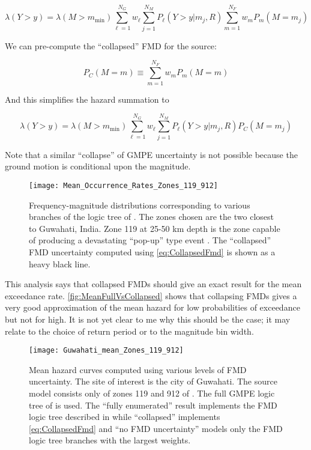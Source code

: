 \documentclass{article}
\begin{document}
$$ \lambda(Y > y) = 
\lambda(M > m_\text{min}) 
\sum_{\ell=1}^{N_G} w_\ell 
\sum_{j=1}^{N_M} 
P_\ell(Y > y|m_j,R) 
\sum_{m=1}^{N_F} w_m 
P_m(M=m_j) $$

We can pre-compute the ``collapsed'' FMD for the source:

$$ P_C(M=m) \equiv \sum_{m=1}^{N_F} w_m P_m(M=m) $$

And this simplifies the hazard summation to

$$ \lambda(Y > y) = 
\lambda(M > m_\text{min}) 
\sum_{\ell=1}^{N_G} w_\ell 
\sum_{j=1}^{N_M} 
P_\ell(Y > y|m_j,R) 
P_C(M=m_j) $$

Note that a similar ``collapse'' of GMPE uncertainty is not possible because the ground motion is conditional upon the magnitude.

\begin{figure}[!htb]
\begin{adjustbox}{center}
\texttt{[image: Mean\_Occurrence\_Rates\_Zones\_119\_912]}
\end{adjustbox}
\caption[Frequency-magnitude distributions for two zones nearest to Guwahati, India]{Frequency-magnitude distributions corresponding to various branches of the logic tree of \cite{nath2012probabilistic}. The zones chosen are the two closest to Guwahati, India. Zone 119 at 25-50 km depth is the zone capable of producing a devastating ``pop-up'' type event \citep{Bilham2001, nath2012ground}. The ``collapsed'' FMD uncertainty computed using \eqref{eq:CollapsedFmd} is shown as a heavy black line.} 
\label{fig:CollapsedFmd}
\end{figure}

This analysis says that collapsed FMDs should give an exact result for the mean exceedance rate. \autoref{fig:MeanFullVsCollapsed} shows that collapsing FMDs gives a very good approximation of the mean hazard for low probabilities of exceedance but not for high. It is not yet clear to me why this should be the case; it may relate to the choice of return period or to the magnitude bin width. 

\begin{figure}[!htb]
\begin{adjustbox}{center}
\texttt{[image: Guwahati\_mean\_Zones\_119\_912]}
\end{adjustbox}
\caption[Mean hazard curves computed using various levels of FMD uncertainty]{Mean hazard curves computed using various levels of FMD uncertainty. The site of interest is the city of Guwahati. The source model consists only of zones 119 and 912 of \cite{nath2012probabilistic}. The full GMPE logic tree of \cite{nath2012probabilistic} is used. The ``fully enumerated'' result implements the FMD logic tree described in \cite{nath2012probabilistic} while ``collapsed'' implements \eqref{eq:CollapsedFmd} and ``no FMD uncertainty'' models only the FMD logic tree branches with the largest weights.} 
\label{fig:MeanFullVsCollapsed}
\end{figure}
\end{document}
